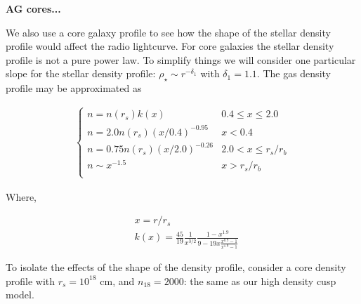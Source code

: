 \documentclass[usenatbib,fleqn]{mnras}
\begin{document}


{\bf AG cores...}

We also use a core galaxy profile to see how the shape of the stellar
density profile would affect the radio lightcurve. For core galaxies
the stellar density profile is not a pure power law. To simplify
things we will consider one particular slope for the stellar density
profile: $\rho_\star\sim r^{-\delta_1}$ with $\delta_1=1.1$. The gas
density profile may be approximated as

\begin{align}
\begin{cases}
n=n(r_s) k(x) & 0.4 \leq x\leq 2.0\\
n = 2.0 n(r_s) (x/0.4)^{-0.95} & x < 0.4\\
n = 0.75 n(r_s) (x/2.0)^{-0.26} & 2.0< x \leq r_s/r_b\\
n \sim x^{-1.5} & x>r_s/r_b\\
\end{cases}
\label{eq:cores}
\end{align}

Where, 

\begin{align}
  &x=r/r_s\\\nonumber
  &k(x)=\frac{45}{19} \frac{1}{x^{3/2}} \frac{1-x^{1.9}}{9-19
      x\frac{x^{0.9}-1}{x^{1.9}-1}}
\end{align}

To isolate the effects of the shape of the density profile, consider a
core density profile with $r_s=10^{18}$ cm, and $n_{18}=2000$: the
same as our high density cusp model.
\end{document}
